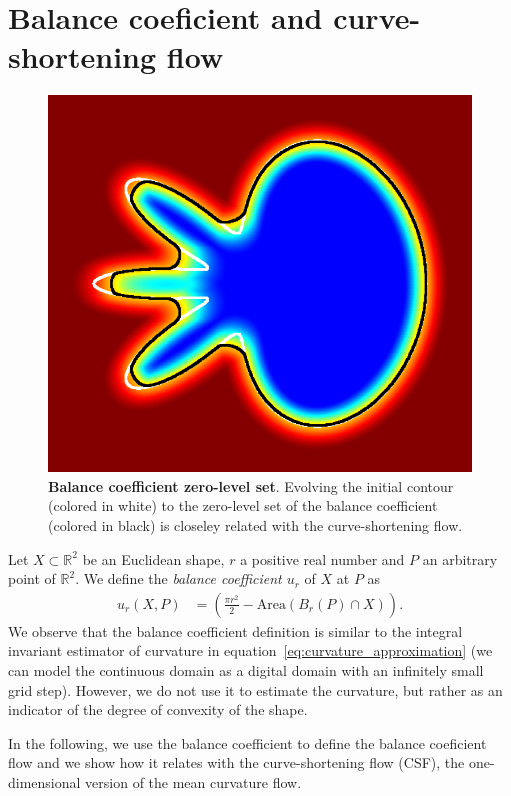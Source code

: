 \documentclass[review]{siamart220329}
\newcommand{\R}{\mathbb{R}}
\begin{document}
\section{Balance coeficient and curve-shortening flow}
%
%
\begin{figure}
 \center
 \includegraphics[scale=0.32]{figures/zero-level-set/balance-coefficient-zero-level-set.png}
 \caption{\textbf{Balance coefficient zero-level set}. Evolving the initial contour (colored in white) to the zero-level set of the balance coefficient (colored in black) is closeley related with the curve-shortening flow.}
 \label{fig:balance-coefficient-zero-level-set}
 \end{figure}
%
%
Let $X \subset \R^2$ be an Euclidean shape, $r$ a positive real number and $P$ an arbitrary point of $\R^2$. We define the \emph{balance coefficient $u_r$} of $X$ at $P$ as
%
%
\begin{align*}
  u_r(X,P) &= \left( \frac{\pi r^2}{2} - \text{Area}(B_r(P) \cap X) \right).
\end{align*}
%
%
We observe that the balance coefficient definition is similar to the
integral invariant estimator of curvature in
equation~\eqref{eq:curvature_approximation} (we can model the
continuous domain as a digital domain with an infinitely small grid
step). However, we do not use it to estimate the curvature, but rather
as an indicator of the degree of convexity of the shape.

In the following, we use the balance coefficient to define the balance
coeficient flow and we show how it relates with the curve-shortening
flow (CSF), the one-dimensional version of the mean curvature flow.
\end{document}
